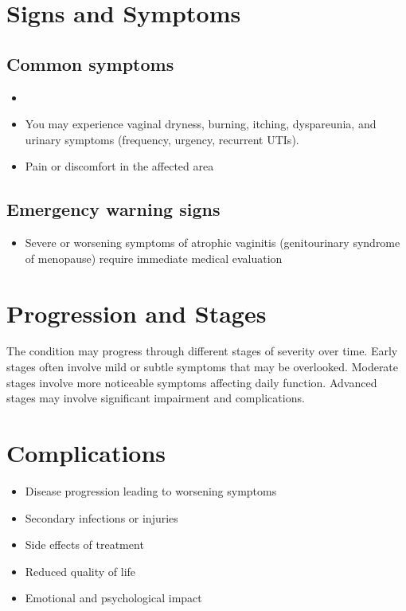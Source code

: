 \section{Signs and Symptoms}

\subsection{Common symptoms}
\begin{itemize}[noitemsep]
  \item \item You may experience vaginal dryness, burning, itching, dyspareunia, and urinary symptoms (frequency, urgency, recurrent UTIs).

  \item Pain or discomfort in the affected area
  \end{itemize}

\subsection{Emergency warning signs}
\begin{itemize}[noitemsep]
  \item Severe or worsening symptoms of atrophic vaginitis (genitourinary syndrome of menopause) require immediate medical evaluation
\end{itemize}
\section{Progression and Stages}
The condition may progress through different stages of severity over time. Early stages often involve mild or subtle symptoms that may be overlooked. Moderate stages involve more noticeable symptoms affecting daily function. Advanced stages may involve significant impairment and complications.
\section{Complications}
\begin{itemize}[noitemsep]
  \item Disease progression leading to worsening symptoms
  \item Secondary infections or injuries
  \item Side effects of treatment
  \item Reduced quality of life
  \item Emotional and psychological impact
\end{itemize}
